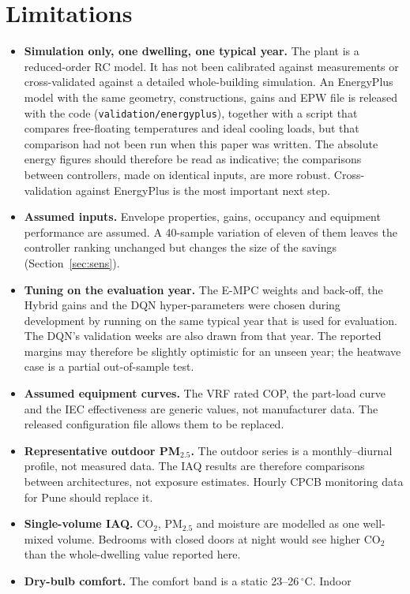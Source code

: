 \section{Limitations}\label{sec:limits}
\begin{itemize}
\item \textbf{Simulation only, one dwelling, one typical year.} The plant is a reduced-order
RC model. It has not been calibrated against measurements or cross-validated against a
detailed whole-building simulation. An EnergyPlus model with the same geometry,
constructions, gains and EPW file is released with the code
(\texttt{validation/energyplus}), together with a script that compares free-floating
temperatures and ideal cooling loads, but that comparison had not been run when this
paper was written. The
absolute energy figures should therefore be read as indicative; the comparisons
between controllers, made on identical inputs, are more robust. Cross-validation
against EnergyPlus is the most important next step.
\item \textbf{Assumed inputs.} Envelope properties, gains, occupancy and equipment
performance are assumed. A 40-sample variation of eleven of them leaves the controller
ranking unchanged but changes the size of the savings (Section~\ref{sec:sens}).
\item \textbf{Tuning on the evaluation year.} The E-MPC weights and back-off, the
Hybrid gains and the DQN hyper-parameters were chosen during development by running on
the same typical year that is used for evaluation. The DQN's validation weeks are also
drawn from that year. The reported margins may therefore be slightly optimistic for an
unseen year; the heatwave case is a partial out-of-sample test.
\item \textbf{Assumed equipment curves.} The VRF rated COP, the part-load curve and the
IEC effectiveness are generic values, not manufacturer data. The released configuration
file allows them to be replaced.
\item \textbf{Representative outdoor PM$_{2.5}$.} The outdoor series is a monthly--diurnal
profile, not measured data. The IAQ results are therefore comparisons between
architectures, not exposure estimates. Hourly CPCB monitoring data for Pune should
replace it.
\item \textbf{Single-volume IAQ.} CO$_2$, PM$_{2.5}$ and moisture are modelled as one
well-mixed volume. Bedrooms with closed doors at night would see higher CO$_2$ than the
whole-dwelling value reported here.
\item \textbf{Dry-bulb comfort.} The comfort band is a static 23--26\,$^\circ$C. Indoor

\end{itemize}
